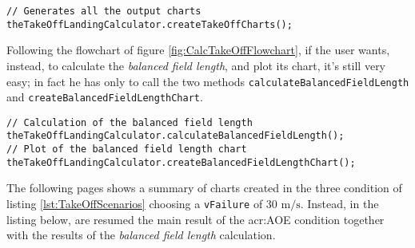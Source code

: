 \bigskip
\begin{lstlisting}[caption={Take-off charts creation}, captionpos=b, tabsize=2]
// Generates all the output charts
theTakeOffLandingCalculator.createTakeOffCharts();
\end{lstlisting}
%
Following the flowchart of figure \ref{fig:CalcTakeOffFlowchart}, if the user wants, instead, to calculate the \emph{balanced field length}, and plot its chart, it's still very easy; in fact he has only to call the two methods \lstinline[language=Java]!calculateBalancedFieldLength! and \lstinline[language=Java]!createBalancedFieldLengthChart!.

\bigskip
\begin{lstlisting}[caption={Balanced field length calculation and plot}, captionpos=b, tabsize=2]
// Calculation of the balanced field length
theTakeOffLandingCalculator.calculateBalancedFieldLength();
// Plot of the balanced field length chart
theTakeOffLandingCalculator.createBalancedFieldLengthChart();
\end{lstlisting}
%
The following pages shows a summary of charts created in the three condition of listing \ref{lst:TakeOffScenarios} choosing a \lstinline[language=Java]!vFailure! of 30 $\si{\meter\per\second}$. Instead, in the listing below, are resumed the main result of the \gls{acr:AOE} condition together with the results of the \emph{balanced field length} calculation.

